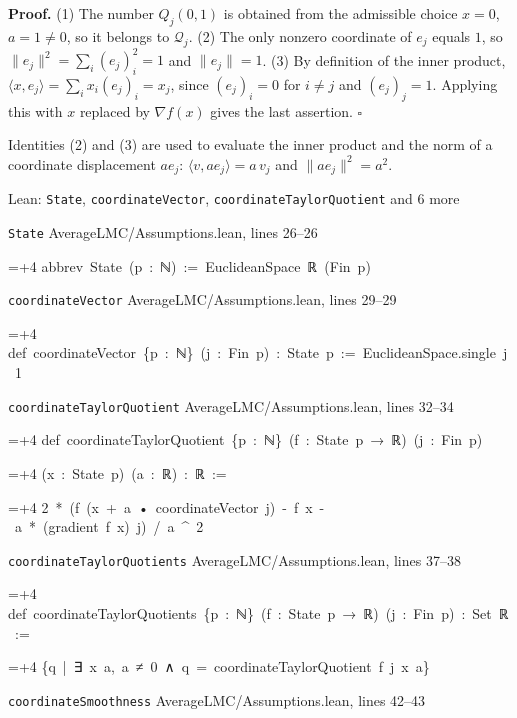 \documentclass[11pt,a4paper]{article}
\newlength{\leancharwidth}
\newenvironment{leancode}{\par\smallskip\begingroup\ttfamily\footnotesize\raggedright
  \settowidth{\leancharwidth}{M}\setlength{\parskip}{0pt}\setlength{\parindent}{0pt}
  \frenchspacing}{\par\endgroup\smallskip}
\newcommand{\leanline}[2]{\hangindent=\dimexpr#1\leancharwidth+4\leancharwidth\relax
  \hangafter=1\noindent\hspace*{#1\leancharwidth}#2\par}
\newcommand{\leansource}[1]{\par{\footnotesize\color{leanmuted}#1}\par}
\begin{document}
\textbf{Proof.} (1) The number \(Q_j(0,1)\) is obtained from the admissible choice \(x=0\), \(a=1\ne0\), so it belongs to \(\mathcal Q_j\). (2) The only nonzero coordinate of \(e_j\) equals \(1\), so \(\|e_j\|^2=\sum_i(e_j)_i^2=1\) and \(\|e_j\|=1\). (3) By definition of the inner product, \(\langle x,e_j\rangle=\sum_ix_i(e_j)_i=x_j\), since \((e_j)_i=0\) for \(i\ne j\) and \((e_j)_j=1\). Applying this with \(x\) replaced by \(\nabla f(x)\) gives the last assertion. \(\square\)




Identities (2) and (3) are used to evaluate the inner product and the norm of a coordinate displacement \(ae_j\): \(\langle v,ae_j\rangle=a\,v_j\) and \(\|ae_j\|^2=a^2\).

\begin{leanbox}{Lean: \texttt{State}, \texttt{coordinateVector}, \texttt{coordinateTaylorQuotient} and 6 more}
\leansource{\texttt{State} \quad AverageLMC/\allowbreak{}Assumptions.lean, lines 26–26}
\begin{leancode}
\leanline{0}{abbrev\ State\ (p\ :\ ℕ)\ :=\ EuclideanSpace\ ℝ\ (Fin\ p)}
\end{leancode}
\leansource{\texttt{coordinateVector} \quad AverageLMC/\allowbreak{}Assumptions.lean, lines 29–29}
\begin{leancode}
\leanline{0}{def\ coordinateVector\ \{p\ :\ ℕ\}\ (j\ :\ Fin\ p)\ :\ State\ p\ :=\ EuclideanSpace.single\ j\ 1}
\end{leancode}
\leansource{\texttt{coordinateTaylorQuotient} \quad AverageLMC/\allowbreak{}Assumptions.lean, lines 32–34}
\begin{leancode}
\leanline{0}{def\ coordinateTaylorQuotient\ \{p\ :\ ℕ\}\ (f\ :\ State\ p\ →\ ℝ)\ (j\ :\ Fin\ p)}
\leanline{4}{(x\ :\ State\ p)\ (a\ :\ ℝ)\ :\ ℝ\ :=}
\leanline{2}{2\ *\ (f\ (x\ +\ a\ •\ coordinateVector\ j)\ -\ f\ x\ -\ a\ *\ (gradient\ f\ x)\ j)\ /\ a\ \textasciicircum{}\ 2}
\end{leancode}
\leansource{\texttt{coordinateTaylorQuotients} \quad AverageLMC/\allowbreak{}Assumptions.lean, lines 37–38}
\begin{leancode}
\leanline{0}{def\ coordinateTaylorQuotients\ \{p\ :\ ℕ\}\ (f\ :\ State\ p\ →\ ℝ)\ (j\ :\ Fin\ p)\ :\ Set\ ℝ\ :=}
\leanline{2}{\{q\ |\ ∃\ x\ a,\ a\ ≠\ 0\ ∧\ q\ =\ coordinateTaylorQuotient\ f\ j\ x\ a\}}
\end{leancode}
\leansource{\texttt{coordinateSmoothness} \quad AverageLMC/\allowbreak{}Assumptions.lean, lines 42–43}
\begin{leancode}

\end{leancode}
\end{leanbox}
\end{document}
